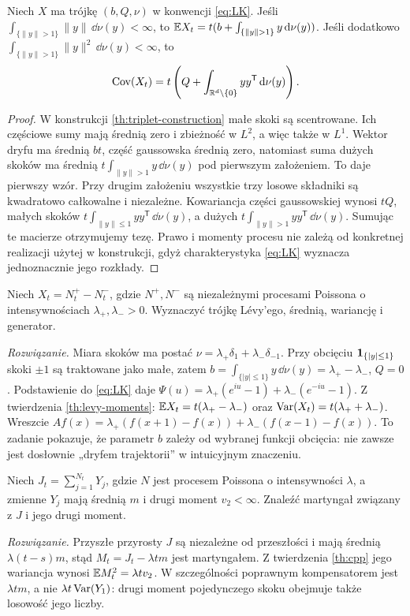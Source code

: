 \begin{twierdzenie}
\label{th:levy-moments}
Niech $X$ ma trójkę $(b,Q,\nu)$ w konwencji
\eqref{eq:LK}. Jeśli
$\int_{\{\|y\|>1\}}\|y\|\,\dd\nu(y)<\infty$,
to $\E X_t=t(b+\int_{\{\|y\|>1\}}y\,\dd\nu(y))$.
Jeśli dodatkowo
$\int_{\{\|y\|>1\}}\|y\|^2\,\dd\nu(y)<\infty$,
to
\[
\operatorname{Cov}(X_t)
=t\left(Q+\int_{\mathbb{R}^d\setminus\{0\}}yy^{\mathsf T}\,\mathrm{d}\nu(y)\right).
\]
\end{twierdzenie}
\begin{proof}
W konstrukcji \ref{th:triplet-construction} małe skoki są
scentrowane. Ich częściowe sumy mają średnią zero i
zbieżność w $L^2$, a więc także w $L^1$.
Wektor dryfu ma średnią $bt$, część gaussowska średnią
zero, natomiast suma dużych skoków ma średnią
$t\int_{\|y\|>1}y\,\dd\nu(y)$ pod pierwszym
założeniem. To daje pierwszy wzór.
Przy drugim założeniu wszystkie trzy losowe składniki
są kwadratowo całkowalne i niezależne. Kowariancja
części gaussowskiej wynosi $tQ$, małych skoków
$t\int_{\|y\|\le1}yy^{\mathsf T}\,\dd\nu(y)$,
a dużych $t\int_{\|y\|>1}yy^{\mathsf T}\,\dd\nu(y)$.
Sumując te macierze otrzymujemy tezę.
Prawo i momenty procesu nie zależą od konkretnej
realizacji użytej w konstrukcji, gdyż charakterystyka
\eqref{eq:LK} wyznacza jednoznacznie jego rozkłady.
\end{proof}

\begin{zadanie}
Niech $X_t=N_t^+-N_t^-$, gdzie $N^+,N^-$ są niezależnymi
procesami Poissona o intensywnościach $\lambda_+,\lambda_->0$.
Wyznaczyć trójkę Lévy'ego, średnią, wariancję i generator.

\emph{Rozwiązanie.} Miara skoków ma postać
$\nu=\lambda_+\delta_1+\lambda_-\delta_{-1}$.
Przy obcięciu $\mathbf{1}_{\{|y|\le1\}}$ skoki $\pm1$
są traktowane jako małe, zatem
$b=\int_{\{|y|\le1\}}y\,\dd\nu(y)=\lambda_+-\lambda_-$,
$Q=0$. Podstawienie do \eqref{eq:LK} daje
$\Psi(u)=\lambda_+(e^{iu}-1)+\lambda_-(e^{-iu}-1)$.
Z twierdzenia \ref{th:levy-moments}:
$\mathbb{E} X_t=t(\lambda_+-\lambda_-)$ oraz
$\operatorname{Var}(X_t)=t(\lambda_++\lambda_-)$. Wreszcie
$Af(x)=\lambda_+(f(x+1)-f(x))+
\lambda_-(f(x-1)-f(x))$.
To zadanie pokazuje, że parametr $b$ zależy od wybranej
funkcji obcięcia: nie zawsze jest dosłownie „dryfem
trajektorii” w intuicyjnym znaczeniu.
\end{zadanie}

\begin{zadanie}
Niech $J_t=\sum_{j=1}^{N_t}Y_j$, gdzie
$N$ jest procesem Poissona o intensywności $\lambda$,
a zmienne $Y_j$ mają średnią $m$ i drugi moment $v_2<\infty$.
Znaleźć martyngał związany z $J$ i jego drugi moment.

\emph{Rozwiązanie.} Przyszłe przyrosty $J$ są
niezależne od przeszłości i mają średnią
$\lambda(t-s)m$, stąd
$M_t=J_t-\lambda tm$ jest martyngałem.
Z twierdzenia \ref{th:cpp} jego wariancja wynosi
$\mathbb{E} M_t^2=\lambda tv_2$.
W szczególności poprawnym kompensatorem jest
$\lambda tm$, a nie $\lambda t\operatorname{Var}(Y_1)$:
drugi moment pojedynczego skoku obejmuje także losowość
jego liczby.
\end{zadanie}

